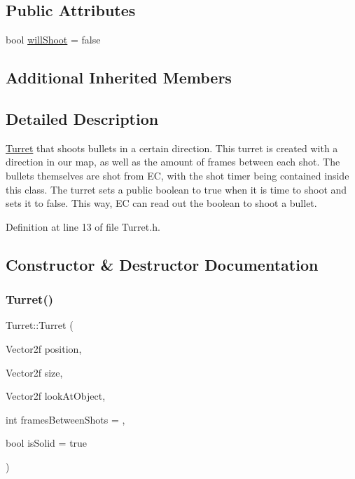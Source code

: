 \subsection*{Public Attributes}
\begin{DoxyCompactItemize}
\item 
bool \hyperlink{class_turret_a342932889ec85dbc05e73341ad658e19}{will\+Shoot} = false
\end{DoxyCompactItemize}
\subsection*{Additional Inherited Members}


\subsection{Detailed Description}
\hyperlink{class_turret}{Turret} that shoots bullets in a certain direction. This turret is created with a direction in our map, as well as the amount of frames between each shot. The bullets themselves are shot from EC, with the shot timer being contained inside this class. The turret sets a public boolean to true when it is time to shoot and sets it to false. This way, EC can read out the boolean to shoot a bullet. 

Definition at line 13 of file Turret.\+h.



\subsection{Constructor \& Destructor Documentation}
\mbox{\label{class_turret_a78913e2baf94c133ca9e1e18bcc24304}} 
\subsubsection{\texorpdfstring{Turret()}{Turret()}}
{\footnotesize\ttfamily Turret\+::\+Turret (\begin{DoxyParamCaption}\item[{Vector2f}]{position,  }\item[{Vector2f}]{size,  }\item[{Vector2f}]{look\+At\+Object,  }\item[{int}]{frames\+Between\+Shots = {},  }\item[{bool}]{is\+Solid = {\ttfamily true} }\end{DoxyParamCaption})}



